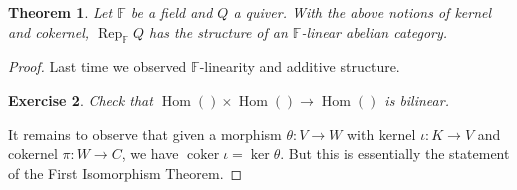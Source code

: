 \documentclass{book}
\newtheorem{theorem}{Theorem}[section]
\newtheorem {exercise}[theorem] {Exercise}
\DeclareMathOperator{\Hom}{Hom}
\DeclareMathOperator{\Rep}{Rep}
\DeclareMathOperator{\coker}{coker}
\begin{document}
        \begin{theorem}
            Let $\mathbb{F}$ be a field and $Q$ a quiver. With the above notions of kernel and cokernel, $\Rep_\mathbb{F}Q$ has the structure of an $\mathbb{F}$-linear abelian category.
        \end{theorem}
        
        \begin{proof}
            Last time we observed $\mathbb{F}$-linearity and additive structure. 
                \begin{exercise}
                    Check that $\Hom()\times\Hom()\to\Hom()$ is bilinear.
                \end{exercise}
            It remains to observe that given a morphism $\theta:V\to W$ with kernel $\iota:K\to V$ and cokernel $\pi:W\to C$, we have $\coker\iota=\ker\theta.$ But this is essentially the statement of the First Isomorphism Theorem.
        \end{proof}
        
\end{document}
